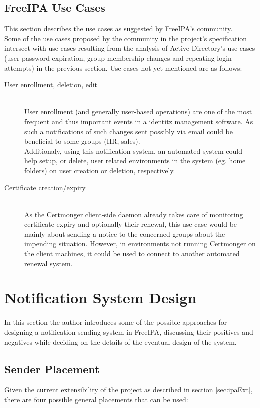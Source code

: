 \section{FreeIPA Use Cases}
This section describes the use cases as suggested by FreeIPA's community. \\
Some of the use cases proposed by the community in the project's specification intersect with use cases resulting from the analysis of Active Directory's use cases (user password expiration, group membership changes and repeating login attempts) in the previous section.
Use cases not yet mentioned are as follows:
\begin{description}
    \item[User enrollment, deletion, edit]\hfill \\
        User enrollment (and generally user-based operations) are one of the most frequent and thus important events in a identitz management software.
        As such a notifications of such changes sent possibly via email could be beneficial to some groups (HR, sales). \\
        Additionaly, using this notification system, an automated system could help setup, or delete, user related environments in the system (eg. home folders) on user creation or deletion, respectively.
    \item[Certificate creation/expiry]\hfill \\
        As the Certmonger client-side daemon already takes care of monitoring certificate expiry and optionally their renewal, this use case would be mainly about sending a notice to the concerned groups
        about the impending situation. However, in environments not running Certmonger on the client machines, it could be used to connect to another automated renewal system.
\end{description}

\chapter{Notification System Design}
\label{chp:appDesign}
In this section the author introduces some of the possible approaches for designing a notification sending system in FreeIPA, discussing their positives and negatives while deciding on the details
of the eventual design of the system.
\section{Sender Placement}
\label{sec:sendPlace}
Given the current extensibility of the project as described in section \ref{sec:ipaExt},
there are four possible general placements that can be used:

